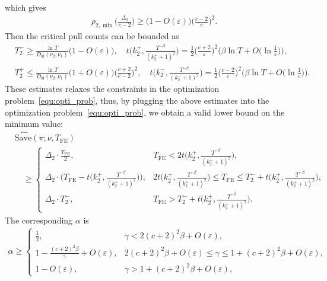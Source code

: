 \documentclass[twoside,11pt]{article}
\newcommand{\kl}{D_{\mathrm{kl}}}
\newcommand{\Tfe}{T_{\mathrm{FE}}}
\newcommand{\Saved}{\mathrm{Save}}
\begin{document}
which gives
\begin{align}\label{equ:tight_rho_min}
    \rho_{2,\min}\Big(\frac{\Delta_2}{c-2}\Big)\geq \big(1-O(\varepsilon) \big)\Big(\frac{c-2}{c}\Big)^2.
\end{align}
Then the critical pull counts can be bounded as
\begin{align}
    &
    T_2^- \geq \frac{\ln T}{\kl(\nu_2,\nu_1) }\big(1-O(\varepsilon) \big)
    ,\quad
     t\Big(k_2^+,\frac{T^{-\beta}}{(k_2^++1)^2}\Big)   
        =
        \frac{1}{2}\Big(\frac{c+2}{\varepsilon}\Big)^2\Big(\beta\ln T + O\Big(\ln\frac{1}{\varepsilon}\Big)\Big),
    \\
    &
    T_2^+ \leq \frac{\ln T}{\kl(\nu_2,\nu_1) }\big(1+O(\varepsilon) \big)\Big(\frac{c+2}{c-2}\Big)^2
    ,\quad
    t\Big(k_2^-,\frac{T^{-\beta}}{(k_2^-+1)^2}\Big)
        = 
        \frac{1}{2}\Big(\frac{c-2}{\varepsilon}\Big)^2\Big(\beta\ln T + O\Big(\ln\frac{1}{\varepsilon}\Big)\Big)
    .
\end{align}
These estimates relaxes the constraints in the optimization problem~\eqref{equ:opti_prob}, thus, 
by plugging the above estimates into the optimization problem~\eqref{equ:opti_prob}, we obtain a valid lower bound on the minimum value:
\begin{align}
    &\widehat{\Saved}(\pi;\nu,\Tfe)
    \\
    &\quad\geq
    \begin{cases}
        \Delta_2\cdot \frac{\Tfe}{2}, &\Tfe< 2 t\big(k_2^+,\frac{T^{-\beta}}{(k_2^++1)^2}\big) , 
        \\
        \Delta_2\cdot \Big(\Tfe - t\big(k_2^+,\frac{T^{-\beta}}{(k_2^++1)^2}\big)\Big)  ,&
             2 t\big(k_2^+,\frac{T^{-\beta}}{(k_2^++1)^2}\big)  
            \leq
            \Tfe
            \leq
            T_2^- + t\big(k_2^+,\frac{T^{-\beta}}{(k_2^++1)^2}\big) ,
        \\
        \Delta_2\cdot T_2^-, & \Tfe>T_2^- + t\big(k_2^+,\frac{T^{-\beta}}{(k_2^++1)^2}\big) .
    \end{cases}
\end{align}
The corresponding $\alpha$ is 
\begin{align}\label{equ:tight_alpha_two_item}
    \alpha \geq
    \begin{cases}
        \frac{1}{2}, &\gamma < 2 (c+2)^2\beta + O(\varepsilon),  
        \\
        1-\frac{(c+2)^2\beta}{\gamma}+O(\varepsilon) ,&
             2 (c+2)^2\beta + O(\varepsilon) \leq \gamma \leq
            1 + (c+2)^2\beta + O(\varepsilon),
        \\
        1- O(\varepsilon) , & \gamma> 1 + (c+2)^2\beta + O(\varepsilon),
    \end{cases}
\end{align}
\end{document}
